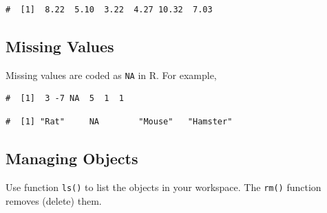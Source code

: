 \documentclass[a4paper,9pt,twocolumn,twoside,printwatermark=false]{pinp}
\begin{document}
\begin{ShadedResult}
\begin{verbatim}
#  [1]  8.22  5.10  3.22  4.27 10.32  7.03
\end{verbatim}
\end{ShadedResult}

\subsection{Missing Values}\label{missing-values}

Missing values are coded as \texttt{NA} in R. For example,

\begin{Shaded}
\begin{Highlighting}[]
\StringTok{ }\NormalTok{(}\NormalTok{, }\OperatorTok{-}\NormalTok{, }\NormalTok{, }\NormalTok{, }\NormalTok{, }\NormalTok{) }
\end{Highlighting}
\end{Shaded}

\begin{ShadedResult}
\begin{verbatim}
#  [1]  3 -7 NA  5  1  1
\end{verbatim}
\end{ShadedResult}

\begin{Shaded}
\begin{Highlighting}[]
\StringTok{ }\NormalTok{(}\NormalTok{, }\NormalTok{, }\NormalTok{, }\NormalTok{)}
\end{Highlighting}
\end{Shaded}

\begin{ShadedResult}
\begin{verbatim}
#  [1] "Rat"     NA        "Mouse"   "Hamster"
\end{verbatim}
\end{ShadedResult}

\subsection{Managing Objects}\label{managing-objects}

Use function \texttt{ls()} to list the objects in your workspace. The
\texttt{rm()} function removes (delete) them.
\end{document}
